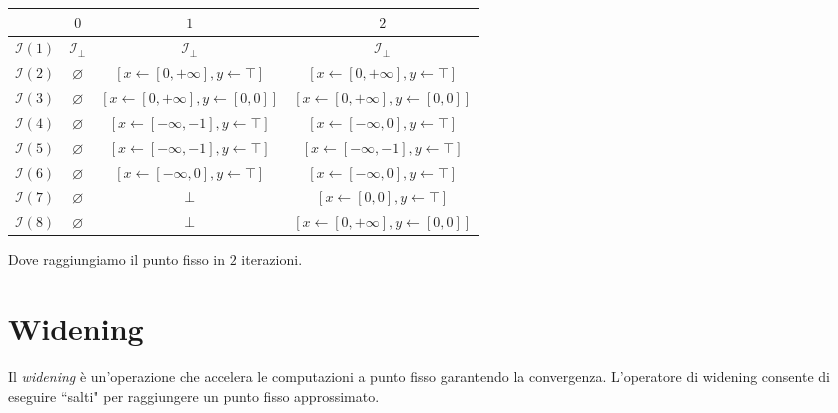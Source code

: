 \begin{table}[H]
    \centering
    \begin{subtable}{\linewidth}
        \centering
        \begin{tabular}{|c|c|c|c|}
            \hline
            & $0$ 
            & $1$ 
            & $2$ \\ \hline
            $\mathcal{I}(1)$ 
            & $\mathcal{I}_\bot$ 
            & $\mathcal{I}_\bot$ 
            & $\mathcal{I}_\bot$ \\
            \hline
            $\mathcal{I}(2)$ 
            & $\varnothing$ 
            & $[x \gets [0, +\infty], y \gets \top]$ 
            & $[x \gets [0, +\infty], y \gets \top]$ \\
            \hline
            $\mathcal{I}(3)$ 
            & $\varnothing$ 
            & $[x \gets [0, +\infty], y \gets [0, 0]]$
            & $[x \gets [0, +\infty], y \gets [0, 0]]$ \\
            \hline
            $\mathcal{I}(4)$ 
            & $\varnothing$ 
            & $[x \gets [-\infty, -1], y \gets \top]$
            & $[x \gets [-\infty, 0], y \gets \top]$ \\
            \hline
            $\mathcal{I}(5)$ 
            & $\varnothing$ 
            & $[x \gets [-\infty, -1], y \gets \top]$
            & $[x \gets [-\infty, -1], y \gets \top]$ \\
            \hline
            $\mathcal{I}(6)$ 
            & $\varnothing$ 
            & $[x \gets [-\infty, 0], y \gets \top]$
            & $[x \gets [-\infty, 0], y \gets \top]$ \\
            \hline
            $\mathcal{I}(7)$ 
            & $\varnothing$ 
            & $\bot$
            & $[x \gets [0, 0], y \gets \top]$ \\
            \hline
            $\mathcal{I}(8)$ 
            & $\varnothing$ 
            & $\bot$
            & $[x \gets [0, +\infty], y \gets [0, 0]]$ \\
            \hline
        \end{tabular}
    \end{subtable}
\end{table}
Dove raggiungiamo il punto fisso in $2$ iterazioni.
\section{Widening}
Il \textit{widening} è un'operazione che accelera le computazioni a punto fisso garantendo
la convergenza. L'operatore di widening consente di eseguire ``salti" per raggiungere
un punto fisso approssimato.

